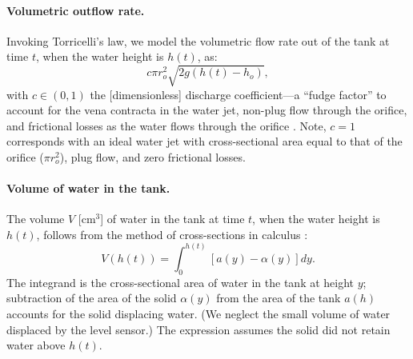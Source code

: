 \documentclass[openacc]{rsproca_new}%
\begin{document}
\paragraph{Volumetric outflow rate.}
Invoking Torricelli's law, we model the volumetric flow rate out of the tank at time $t$, when the water height is $h(t)$, as:
\begin{equation}
	c \pi r_o^2 \sqrt{2 g(h(t)-h_o)}, \label{eq:outletflow}
\end{equation}
with $c\in(0,1)$ the [dimensionless] discharge coefficient---a ``fudge factor'' to account for the vena contracta in the water jet, non-plug flow through the orifice, and frictional losses as the water flows through the orifice \cite{horsch2020simple,teoman2022discharge,hicks2014determining,blasone2015discharge,lienhard1984velocity,wadhwa2021study}. 
Note, $c=1$ corresponds with an ideal water jet with cross-sectional area equal to that of the orifice ($\pi r_o^2$), plug flow, and zero frictional losses.

\paragraph{Volume of water in the tank.} 
The volume $V$ [cm$^3$] of water in the tank at time $t$, when the water height is $h(t)$, follows from the method of cross-sections in calculus \cite{debook}:
\begin{equation}
	V(h(t))=\int_0^{h(t)} \left[a(y) - \alpha(y) \right] dy. \label{eq:volume}
\end{equation}
The integrand is the cross-sectional area of water in the tank at height $y$; subtraction of the area of the solid $\alpha(y)$ from the area of the tank $a(h)$ accounts for the solid displacing water. (We neglect the small volume of water displaced by the level sensor.) The expression assumes the solid did not retain water above $h(t)$.
\end{document}
